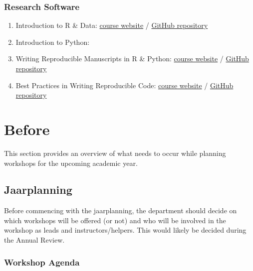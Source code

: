 \documentclass[
  letterpaper,
  DIV=11,
  numbers=noendperiod]{scrreprt}
\begin{document}
\subsection*{Research Software}\label{research-software}

\begin{enumerate}
\def\labelenumi{\arabic{enumi}.}
\item
  Introduction to R \& Data:
  \href{https://utrechtuniversity.github.io/workshop-introduction-to-R-and-data/}{course
  website} /
  \href{https://github.com/UtrechtUniversity/workshop-introduction-to-r-and-data}{GitHub
  repository}
\item
  Introduction to Python:
\item
  Writing Reproducible Manuscripts in R \& Python:
  \href{https://nehamoopen.github.io/worcshop-book/}{course website} /
  \href{https://github.com/nehamoopen/worcshop-book}{GitHub repository}
\item
  Best Practices in Writing Reproducible Code:
  \href{https://utrechtuniversity.github.io/workshop-computational-reproducibility/docs/index.html}{course
  website} /
  \href{https://github.com/UtrechtUniversity/workshop-computational-reproducibility}{GitHub
  repository}
\end{enumerate}

\chapter*{Before}\label{before}


This section provides an overview of what needs to occur while planning
workshops for the upcoming academic year.

\section*{Jaarplanning}\label{jaarplanning}


Before commencing with the jaarplanning, the department should decide on
which workshops will be offered (or not) and who will be involved in the
workshop as leads and instructors/helpers. This would likely be decided
during the Annual Review.

\subsection*{Workshop Agenda}\label{workshop-agenda}
\end{document}
